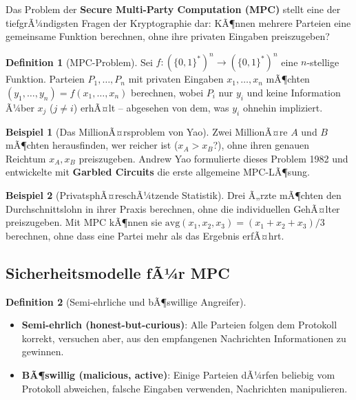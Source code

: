 ﻿\documentclass[a4paper,12pt]{scrreprt}
\theoremstyle{definition}
\newtheorem{definition}{Definition}[section]
\newtheorem{beispiel}{Beispiel}[section]
\begin{document}
Das Problem der \textbf{Secure Multi-Party Computation (MPC)} stellt eine der tiefgrÃ¼ndigsten Fragen der Kryptographie dar: KÃ¶nnen mehrere Parteien eine gemeinsame Funktion berechnen, ohne ihre privaten Eingaben preiszugeben?

\begin{definition}[MPC-Problem]
Sei $f: (\{0,1\}^*)^n \to (\{0,1\}^*)^n$ eine $n$-stellige Funktion. Parteien $P_1,\ldots,P_n$ mit privaten Eingaben $x_1,\ldots,x_n$ mÃ¶chten $(y_1,\ldots,y_n) = f(x_1,\ldots,x_n)$ berechnen, wobei $P_i$ nur $y_i$ und keine Information Ã¼ber $x_j$ ($j \neq i$) erhÃ¤lt -- abgesehen von dem, was $y_i$ ohnehin impliziert.
\end{definition}

\begin{beispiel}[Das MillionÃ¤rsproblem von Yao]
Zwei MillionÃ¤re $A$ und $B$ mÃ¶chten herausfinden, wer reicher ist ($x_A > x_B$?), ohne ihren genauen Reichtum $x_A, x_B$ preiszugeben. Andrew Yao formulierte dieses Problem 1982 \cite{Yao82} und entwickelte mit \textbf{Garbled Circuits} die erste allgemeine MPC-LÃ¶sung.
\end{beispiel}

\begin{beispiel}[PrivatsphÃ¤reschÃ¼tzende Statistik]
Drei Ã„rzte mÃ¶chten den Durchschnittslohn in ihrer Praxis berechnen, ohne die individuellen GehÃ¤lter preiszugeben. Mit MPC kÃ¶nnen sie $\mathrm{avg}(x_1, x_2, x_3) = (x_1+x_2+x_3)/3$ berechnen, ohne dass eine Partei mehr als das Ergebnis erfÃ¤hrt.
\end{beispiel}

\subsection{Sicherheitsmodelle fÃ¼r MPC}

\begin{definition}[Semi-ehrliche und bÃ¶swillige Angreifer]
\begin{itemize}
    \item \textbf{Semi-ehrlich (honest-but-curious)}: Alle Parteien folgen dem Protokoll korrekt, versuchen aber, aus den empfangenen Nachrichten Informationen zu gewinnen.
    \item \textbf{BÃ¶swillig (malicious, active)}: Einige Parteien dÃ¼rfen beliebig vom Protokoll abweichen, falsche Eingaben verwenden, Nachrichten manipulieren.
\end{itemize}
\end{definition}
\end{document}
